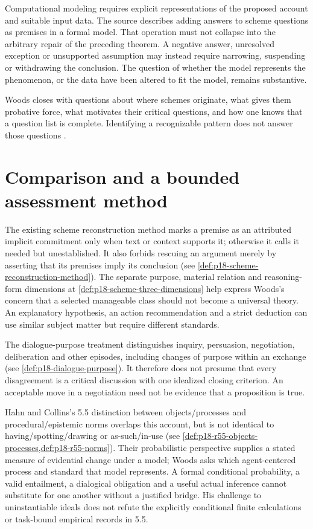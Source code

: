 Computational modeling requires explicit representations of the proposed
account and suitable input data. The source describes adding answers to
scheme questions as premises in a formal model. That operation must not
collapse into the arbitrary repair of the preceding theorem. A negative
answer, unresolved exception or unsupported assumption may instead
require narrowing, suspending or withdrawing the conclusion. The question
of whether the model represents the phenomenon, or the data have been
altered to fit the model, remains substantive.

Woods closes with questions about where schemes originate, what gives
them probative force, what motivates their critical questions, and how
one knows that a question list is complete. Identifying a recognizable
pattern does not answer those questions
\cite[pp.~373--374 and notes~23--24]{Woods2021ReasoningArgumentation}.

\section{Comparison and a bounded assessment method}

The existing scheme reconstruction method marks a premise as an
attributed implicit commitment only when text or context supports it;
otherwise it calls it needed but unestablished. It also forbids rescuing
an argument merely by asserting that its premises imply its conclusion
(see \cref{def:p18-scheme-reconstruction-method}).
The separate purpose, material relation and reasoning-form dimensions
at \cref{def:p18-scheme-three-dimensions} help express Woods's concern
that a selected manageable class should not become a universal theory.
An explanatory hypothesis, an action recommendation and a strict
deduction can use similar subject matter but require different standards.

The dialogue-purpose treatment distinguishes inquiry, persuasion,
negotiation, deliberation and other episodes, including changes of
purpose within an exchange (see \cref{def:p18-dialogue-purpose}).
It therefore does not presume that every disagreement is a critical
discussion with one idealized closing criterion. An acceptable move
in a negotiation need not be evidence that a proposition is true.

Hahn and Collins's 5.5 distinction between objects/processes and
procedural/epistemic norms overlaps this account, but is not identical
to having/spotting/drawing or as-such/in-use
(see \cref{def:p18-r55-objects-processes,def:p18-r55-norms}).
Their probabilistic perspective supplies a stated measure of evidential
change under a model; Woods asks which agent-centered process and standard
that model represents. A formal conditional probability, a valid
entailment, a dialogical obligation and a useful actual inference
cannot substitute for one another without a justified bridge.
His challenge to uninstantiable ideals does not refute the explicitly
conditional finite calculations or task-bound empirical records in 5.5.

